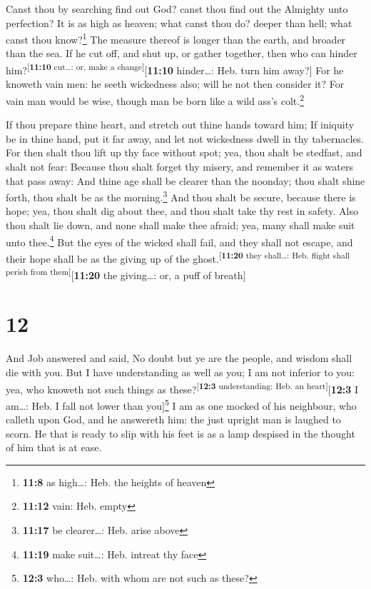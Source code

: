  Canst thou by searching find out God? canst thou find out
the Almighty unto perfection?  It is as high as heaven;
what canst thou do? deeper than hell; what canst thou know?\footnote{\textbf{11:8}
  as high\ldots: Heb. the heights of heaven}  The measure
thereof is longer than the earth, and broader than the sea.
 If he cut off, and shut up, or gather together, then who
can hinder him?\textsuperscript{{[}\textbf{11:10} cut\ldots: or, make a
change{]}}{[}\textbf{11:10} hinder\ldots: Heb. turn him away?{]}
 For he knoweth vain men: he seeth wickedness also; will
he not then consider it?  For vain man would be wise,
though man be born like a wild ass's colt.\footnote{\textbf{11:12} vain:
  Heb. empty}

 If thou prepare thine heart, and stretch out thine hands
toward him;  If iniquity be in thine hand, put it far
away, and let not wickedness dwell in thy tabernacles. 
For then shalt thou lift up thy face without spot; yea, thou shalt be
stedfast, and shalt not fear:  Because thou shalt forget
thy misery, and remember it as waters that pass away: 
And thine age shall be clearer than the noonday; thou shalt shine forth,
thou shalt be as the morning.\footnote{\textbf{11:17} be clearer\ldots:
  Heb. arise above}  And thou shalt be secure, because
there is hope; yea, thou shalt dig about thee, and thou shalt take thy
rest in safety.  Also thou shalt lie down, and none shall
make thee afraid; yea, many shall make suit unto thee.\footnote{\textbf{11:19}
  make suit\ldots: Heb. intreat thy face}  But the eyes
of the wicked shall fail, and they shall not escape, and their hope
shall be as the giving up of the
ghost.\textsuperscript{{[}\textbf{11:20} they shall\ldots: Heb. flight
shall perish from them{]}}{[}\textbf{11:20} the giving\ldots: or, a puff
of breath{]}

\hypertarget{section-11}{%
\section{12}\label{section-11}}

 And Job answered and said,  No doubt but ye
are the people, and wisdom shall die with you.  But I have
understanding as well as you; I am not inferior to you: yea, who knoweth
not such things as these?\textsuperscript{{[}\textbf{12:3}
understanding: Heb. an heart{]}}{[}\textbf{12:3} I am\ldots: Heb. I fall
not lower than you{]}\footnote{\textbf{12:3} who\ldots: Heb. with whom
  are not such as these?}  I am as one mocked of his
neighbour, who calleth upon God, and he answereth him: the just upright
man is laughed to scorn.  He that is ready to slip with
his feet is as a lamp despised in the thought of him that is at ease.

